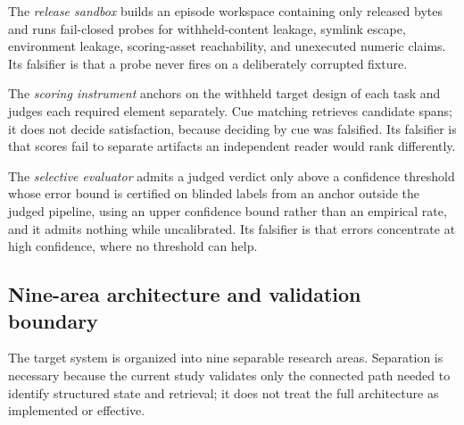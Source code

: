 \documentclass[11pt,a4paper]{article}
\begin{document}
The \emph{release sandbox} builds an episode workspace containing only released
bytes and runs fail-closed probes for withheld-content leakage, symlink escape,
environment leakage, scoring-asset reachability, and unexecuted numeric claims.
Its falsifier is that a probe never fires on a deliberately corrupted fixture.

The \emph{scoring instrument} anchors on the withheld target design of each task
and judges each required element separately.  Cue matching retrieves candidate
spans; it does not decide satisfaction, because deciding by cue was falsified.
Its falsifier is that scores fail to separate artifacts an independent reader
would rank differently.

The \emph{selective evaluator} admits a judged verdict only above a confidence
threshold whose error bound is certified on blinded labels from an anchor outside the judged pipeline, using
an upper confidence bound rather than an empirical rate, and it admits nothing
while uncalibrated.  Its falsifier is that errors concentrate at high confidence,
where no threshold can help.

\subsection{Nine-area architecture and validation boundary}

The target system is organized into nine separable research areas.  Separation is
necessary because the current study validates only the connected path needed to
identify structured state and retrieval; it does not treat the full architecture
as implemented or effective.
\end{document}
